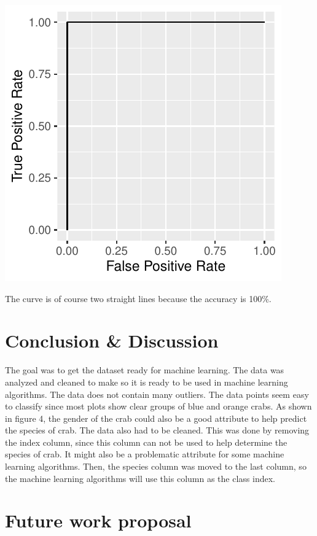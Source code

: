 \documentclass[
]{article}
\begin{document}
\begin{center}\includegraphics{CrabProject_files/figure-latex/roc-1} \end{center}

The curve is of course two straight lines because the accuracy is 100\%.

\newpage

\hypertarget{conclusion-discussion}{%
\section{Conclusion \& Discussion}\label{conclusion-discussion}}

The goal was to get the dataset ready for machine learning. The data was
analyzed and cleaned to make so it is ready to be used in machine
learning algorithms. The data does not contain many outliers. The data
points seem easy to classify since most plots show clear groups of blue
and orange crabs. As shown in figure 4, the gender of the crab could
also be a good attribute to help predict the species of crab. The data
also had to be cleaned. This was done by removing the index column,
since this column can not be used to help determine the species of crab.
It might also be a problematic attribute for some machine learning
algorithms. Then, the species column was moved to the last column, so
the machine learning algorithms will use this column as the class index.

\hypertarget{future-work-proposal}{%
\section{Future work proposal}\label{future-work-proposal}}
\end{document}
